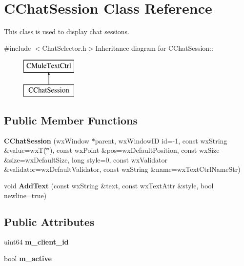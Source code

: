 \section{CChatSession Class Reference}
\label{classCChatSession}


This class is used to display chat sessions.  


{\ttfamily \#include $<$ChatSelector.h$>$}Inheritance diagram for CChatSession::\begin{figure}[H]
\begin{center}
\leavevmode
\includegraphics[height=2cm]{classCChatSession}
\end{center}
\end{figure}
\subsection*{Public Member Functions}
\begin{DoxyCompactItemize}
\item 
{\bfseries CChatSession} (wxWindow $\ast$parent, wxWindowID id=-\/1, const wxString \&value=wxT(\char`\"{}\char`\"{}), const wxPoint \&pos=wxDefaultPosition, const wxSize \&size=wxDefaultSize, long style=0, const wxValidator \&validator=wxDefaultValidator, const wxString \&name=wxTextCtrlNameStr)\label{classCChatSession_ad18e6475fd0a683403140c28eda2dccc}

\item 
void {\bf AddText} (const wxString \&text, const wxTextAttr \&style, bool newline=true)
\end{DoxyCompactItemize}
\subsection*{Public Attributes}
\begin{DoxyCompactItemize}
\item 
uint64 {\bfseries m\_\-client\_\-id}\label{classCChatSession_a5f65a6425dd1d699a99da3baa69e79b2}

\item 
bool {\bfseries m\_\-active}\label{classCChatSession_a5d902745c305bf706b020c64edf1a7c4}

\end{DoxyCompactItemize}


